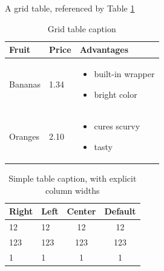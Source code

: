 \documentclass[a4paper, ]{article}
\begin{document}
    A grid table, referenced by Table \ref{tab:my-grid-table}

    \begin{table}[h]
        \caption{Grid table caption}
        \label{tab:my-grid-table}
        \centering
        \begin{tabular}{|p{}|p{}|p{}|}
            \hline
            \bfseries{Fruit} &
            \bfseries{Price} &
            \bfseries{Advantages} \\
            \hline
            Bananas &
            1.34 &
            
    \begin{itemize}
        \item built-in wrapper
        \item bright color
    \end{itemize} \\
            \hline
            Oranges &
            2.10 &
            
    \begin{itemize}
        \item cures scurvy
        \item tasty
    \end{itemize} \\
            \hline
        \end{tabular}
    \end{table}

    \begin{table}[h]
        \caption{Simple table caption, with explicit column widths}
        \label{tab:my-simple-table-explicit}
        \centering
        \begin{tabular}{|p{2cm}|p{1cm}|c|c|}
            \hline
            \bfseries{Right} &
            \bfseries{Left} &
            \bfseries{Center} &
            \bfseries{Default} \\
            \hline
            12 &
            12 &
            12 &
            12 \\
            \hline
            123 &
            123 &
            123 &
            123 \\
            \hline
            1 &
            1 &
            1 &
            1 \\
            \hline
        \end{tabular}
    \end{table}
\end{document}
